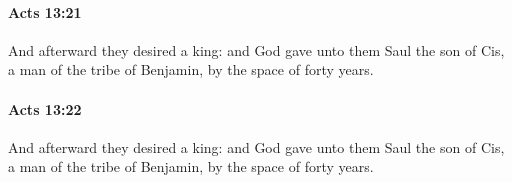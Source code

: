 		\paragraph{Acts 13:21} %
			\label{ACTS-13-21}

			And afterward they desired a king: and God gave unto them Saul the son of Cis, a man of the tribe of Benjamin, by the space of forty years.

			\begin{framed}
			\scriptsize
				\begin{compactdesc}
					\item[SBLG] 
				\end{compactdesc}
			\end{framed}

		\paragraph{Acts 13:22} %
			\label{ACTS-13-22}

			And afterward they desired a king: and God gave unto them Saul the son of Cis, a man of the tribe of Benjamin, by the space of forty years.

